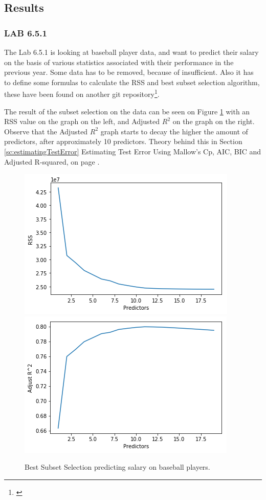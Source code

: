 \subsection{Results}
\subsubsection*{LAB 6.5.1}%
The Lab 6.5.1 is looking at baseball player data, and want to predict their salary on the basis of various statistics associated with their performance in the previous year. Some data has to be removed, because of insufficient. Also it has to define some formulas to calculate the RSS and best subset selection algorithm, these have been found on another git repository\footnote{\cite{Xu2017}}.

The result of the subset selection on the data can be seen on Figure \ref{fig:bestSubsetSelection} with an RSS value on the graph on the left, and Adjusted $R^2$ on the graph on the right. Observe that the Adjusted $R^2$ graph starts to decay the higher the  amount of predictors, after approximately 10 predictors. Theory behind this in Section \ref{sc:estimatingTestError} Estimating Test Error Using Mallow's Cp, AIC, BIC and Adjusted R-squared, on page \pageref{sc:estimatingTestError}.

\begin{figure}[h]
	\centering
	\includegraphics[scale=0.5]{subsetSelection/selectionMethods/fig/bestSubsetSelectionRSS.png}
	\includegraphics[scale=0.5]{subsetSelection/selectionMethods/fig/bestSubsetSelectionRsquared.png}
	\caption{Best Subset Selection predicting salary on baseball players.}
	\label{fig:bestSubsetSelection}
\end{figure}


